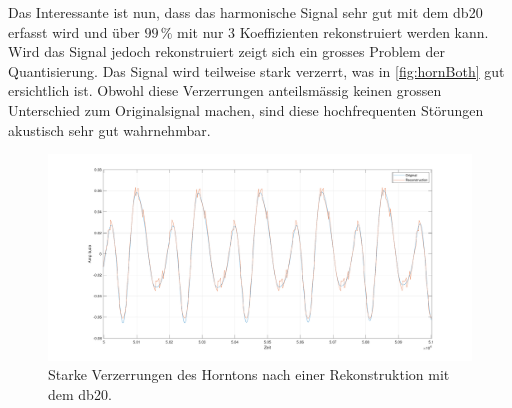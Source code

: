\begin{refsection}
Das Interessante ist nun, dass das harmonische Signal sehr gut mit dem db20 erfasst wird und über $99\,\text{\%}$ mit nur 3 Koeffizienten rekonstruiert werden kann.
Wird das Signal jedoch rekonstruiert zeigt sich ein grosses Problem der Quantisierung.
Das Signal wird teilweise stark verzerrt, was in \autoref{fig:hornBoth} gut ersichtlich ist.
Obwohl diese Verzerrungen anteilsmässig keinen grossen Unterschied zum Originalsignal machen, sind diese hochfrequenten Störungen akustisch sehr gut wahrnehmbar.

\begin{figure}
	\centering
	\includegraphics[width=\linewidth]{papers/compress/Bilder/hornBoth.pdf}
	\caption{Starke Verzerrungen des Horntons nach einer Rekonstruktion mit dem db20.}
	\label{fig:hornBoth}
\end{figure}


\end{refsection}
